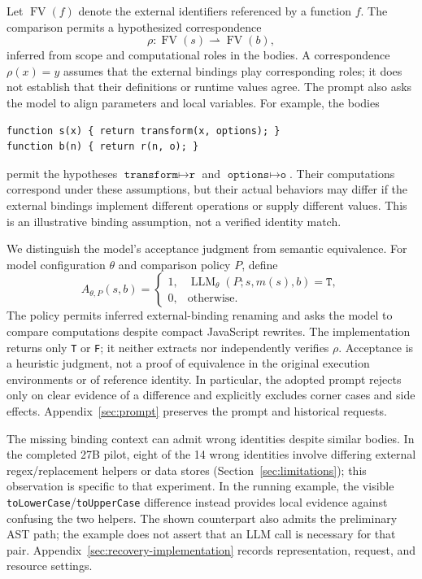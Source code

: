 Let $\operatorname{FV}(f)$ denote the external identifiers referenced by a function $f$. The comparison permits a hypothesized correspondence
\begin{equation}
\rho:\operatorname{FV}(s)\rightharpoonup\operatorname{FV}(b),
\end{equation}
inferred from scope and computational roles in the bodies. A correspondence $\rho(x)=y$ assumes that the external bindings play corresponding roles; it does not establish that their definitions or runtime values agree. The prompt also asks the model to align parameters and local variables. For example, the bodies
\begin{lstlisting}[basicstyle=\ttfamily\small]
function s(x) { return transform(x, options); }
function b(n) { return r(n, o); }
\end{lstlisting}
permit the hypotheses $\texttt{transform}\mapsto\texttt{r}$ and $\texttt{options}\mapsto\texttt{o}$. Their computations correspond under these assumptions, but their actual behaviors may differ if the external bindings implement different operations or supply different values. This is an illustrative binding assumption, not a verified identity match.

We distinguish the model's acceptance judgment from semantic equivalence. For model configuration $\theta$ and comparison policy $P$, define
\begin{equation}
\label{eq:model-acceptance}
A_{\theta,P}(s,b)=\begin{cases}1,&\operatorname{LLM}_{\theta}(P;s,m(s),b)=\texttt{T},\\0,&\text{otherwise}.\end{cases}
\end{equation}
The policy permits inferred external-binding renaming and asks the model to compare computations despite compact JavaScript rewrites. The implementation returns only \texttt{T} or \texttt{F}; it neither extracts nor independently verifies $\rho$. Acceptance is a heuristic judgment, not a proof of equivalence in the original execution environments or of reference identity. In particular, the adopted prompt rejects only on clear evidence of a difference and explicitly excludes corner cases and side effects. Appendix~\ref{sec:prompt} preserves the prompt and historical requests.

The missing binding context can admit wrong identities despite similar bodies. In the completed 27B pilot, eight of the 14 wrong identities involve differing external regex/replacement helpers or data stores (Section~\ref{sec:limitations}); this observation is specific to that experiment. In the running example, the visible \texttt{toLowerCase}/\texttt{toUpperCase} difference instead provides local evidence against confusing the two helpers. The shown counterpart also admits the preliminary AST path; the example does not assert that an LLM call is necessary for that pair. Appendix~\ref{sec:recovery-implementation} records representation, request, and resource settings.

